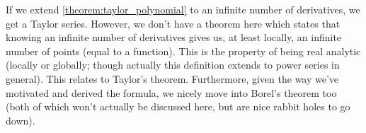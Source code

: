 If we extend \ref{theorem:taylor_polynomial} to an infinite number of derivatives, we get a Taylor series. However, we don't have a theorem here which states that knowing an infinite number of derivatives gives us, at least locally, an infinite number of points (equal to a function). This is the property of being real analytic (locally or globally; though actually this definition extends to power series in general). This relates to Taylor's theorem. Furthermore, given the way we've motivated and derived the formula, we nicely move into Borel's theorem too (both of which won't actually be discussed here, but are nice rabbit holes to go down).

\newpage